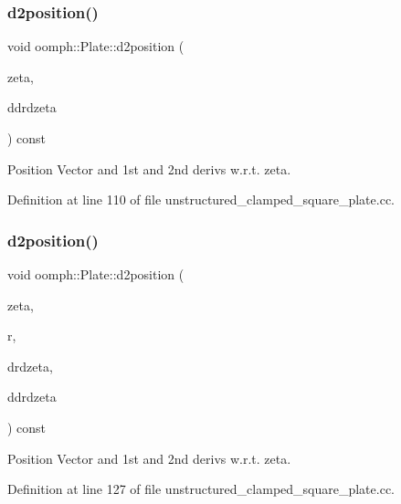 \subsubsection{\texorpdfstring{d2position()}{d2position()}\hspace{0.1cm}{\footnotesize\ttfamily [1/2]}}
{\footnotesize\ttfamily void oomph\+::\+Plate\+::d2position (\begin{DoxyParamCaption}\item[{const Vector$<$ double $>$ \&}]{zeta,  }\item[{Rank\+Three\+Tensor$<$ double $>$ \&}]{ddrdzeta }\end{DoxyParamCaption}) const\hspace{0.3cm}{\ttfamily [inline]}}



Position Vector and 1st and 2nd derivs w.\+r.\+t. zeta. 



Definition at line 110 of file unstructured\+\_\+clamped\+\_\+square\+\_\+plate.\+cc.

\mbox{\label{classoomph_1_1Plate_ad3f465392d03904976c58c1d55c7d6cc}} 
\subsubsection{\texorpdfstring{d2position()}{d2position()}\hspace{0.1cm}{\footnotesize\ttfamily [2/2]}}
{\footnotesize\ttfamily void oomph\+::\+Plate\+::d2position (\begin{DoxyParamCaption}\item[{const Vector$<$ double $>$ \&}]{zeta,  }\item[{Vector$<$ double $>$ \&}]{r,  }\item[{Dense\+Matrix$<$ double $>$ \&}]{drdzeta,  }\item[{Rank\+Three\+Tensor$<$ double $>$ \&}]{ddrdzeta }\end{DoxyParamCaption}) const\hspace{0.3cm}{\ttfamily [inline]}}



Position Vector and 1st and 2nd derivs w.\+r.\+t. zeta. 



Definition at line 127 of file unstructured\+\_\+clamped\+\_\+square\+\_\+plate.\+cc.

